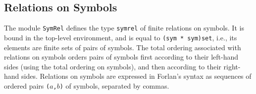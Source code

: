 \subsection{Relations on Symbols}

The module \texttt{SymRel}
%
defines the type \texttt{sym\underscoresym rel}
%
%
of finite relations on symbols.
%
It is bound in the top-level environment, and is
equal to \texttt{(sym * sym)set}, i.e., its elements are finite sets
of pairs of symbols.  The total ordering associated with relations
on symbols orders pairs of symbols first according to their
left-hand sides (using the total ordering on symbols), and then
according to their right-hand sides.
Relations on symbols are expressed in Forlan's syntax as sequences of ordered
pairs \texttt{($a$,$b$)} of symbols, separated by commas.
%
%


